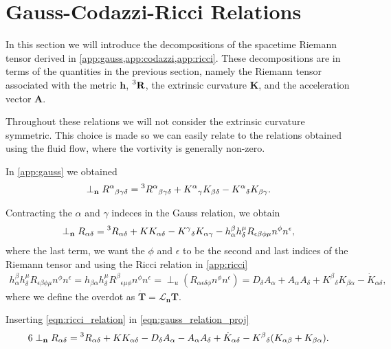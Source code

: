 \section{Gauss-Codazzi-Ricci Relations}

In this section we will introduce the decompositions of the spacetime Riemann tensor derived in \cref{app:gauss,app:codazzi,app:ricci}.
These decompositions are in terms of the quantities in the previous section, namely the Riemann tensor associated with the metric $\mathbf{h}$, $\prescript{3}{}{\mathbf{R}}$, the extrinsic curvature $\mathbf{K}$, and the acceleration vector $\mathbf{A}$.

Throughout these relations we will not consider the extrinsic curvature symmetric. 
This choice is made so we can easily relate to the relations obtained using the fluid flow, where the vortivity is generally non-zero.

In \cref{app:gauss} we obtained
\begin{align}
    \perp_{\mathbf{n}} R^\alpha{}_{\beta\gamma\delta} = \prescript{3}{}R^\alpha{}_{\beta\gamma\delta}+K^\alpha{}_\gamma K_{\beta\delta}-K^\alpha{}_\delta K_{\beta\gamma}.
\end{align}

Contracting the $\alpha$ and $\gamma$ indeces in the Gauss relation, we obtain
\begin{align}
    \perp_{\mathbf{n}} R_{\alpha\delta}  = \prescript{3}{}R_{\alpha\delta}+KK_{\alpha\delta}-K^\gamma{}_\delta K_{\alpha\gamma} - h^\beta_\alpha h^\mu_\delta R_{\epsilon\beta\phi\mu} n^\phi n^\epsilon,
    \label{eqn:gauss_relation_proj}
\end{align}
where the last term, we want the $\phi$ and $\epsilon$ to be the second and last indices of the Riemann tensor and using the Ricci relation in \cref{app:ricci}
\begin{align}
    h^\beta_\alpha h^\mu_\delta R_{\epsilon\beta\phi\mu} n^\phi n^\epsilon= h_{\beta\alpha} h^\mu_\delta R^\beta{}_{\epsilon\mu\phi} n^\phi n^\epsilon = \perp_u(R_{\alpha\epsilon\delta\phi} n^\phi n^\epsilon) = D_\delta A_\alpha + A_\alpha A_\delta + K^\beta{}_\delta K_{\beta\alpha} - \dot{K}_{\alpha\delta},
    \label{eqn:ricci_relation}
\end{align}
where we define the overdot as $\dot{\mathbf{T}}=\mathcal{L}_{\mathbf{n}}\mathbf{T}$.

Inserting \cref{eqn:ricci_relation} in \cref{eqn:gauss_relation_proj}
\begin{align}6
    \perp_{\mathbf{n}} R_{\alpha\delta}=\prescript{3}{}R_{\alpha\delta}+K K_{\alpha\delta}- D_\delta A_\alpha - A_\alpha A_\delta + \dot{K}_{\alpha\delta} -K^\beta{}_\delta (K_{\alpha\beta}+K_{\beta\alpha}).
    \label{eqn:ricci_spatial_proj}
\end{align}


